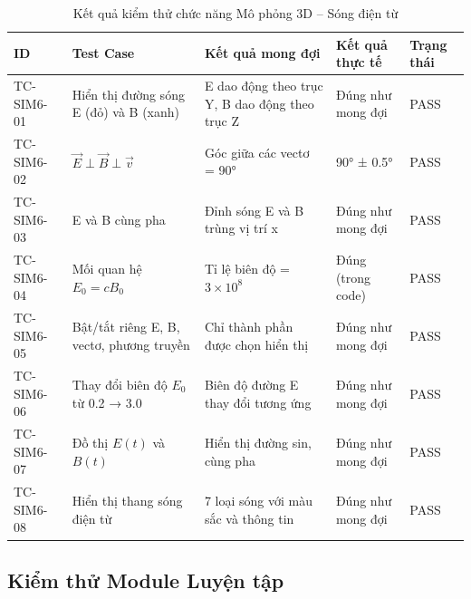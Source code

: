 \begin{table}[H]
\centering
\caption{Kết quả kiểm thử chức năng Mô phỏng 3D – Sóng điện từ}
\begin{tabular}{|p{}|p{}|p{}|p{}|p{}|}
\hline
\textbf{ID} & \textbf{Test Case} & \textbf{Kết quả mong đợi} & \textbf{Kết quả thực tế} & \textbf{Trạng thái} \\
\hline
TC-SIM6-01 & Hiển thị đường sóng E (đỏ) và B (xanh) & E dao động theo trục Y, B dao động theo trục Z & Đúng như mong đợi & PASS \\
\hline
TC-SIM6-02 & $\vec{E} \perp \vec{B} \perp \vec{v}$ & Góc giữa các vectơ = 90° & 90° ± 0.5° & PASS \\
\hline
TC-SIM6-03 & E và B cùng pha & Đỉnh sóng E và B trùng vị trí x & Đúng như mong đợi & PASS \\
\hline
TC-SIM6-04 & Mối quan hệ $E_0 = cB_0$ & Tỉ lệ biên độ = $3 \times 10^8$ & Đúng (trong code) & PASS \\
\hline
TC-SIM6-05 & Bật/tắt riêng E, B, vectơ, phương truyền & Chỉ thành phần được chọn hiển thị & Đúng như mong đợi & PASS \\
\hline
TC-SIM6-06 & Thay đổi biên độ $E_0$ từ 0.2 → 3.0 & Biên độ đường E thay đổi tương ứng & Đúng như mong đợi & PASS \\
\hline
TC-SIM6-07 & Đồ thị $E(t)$ và $B(t)$ & Hiển thị đường sin, cùng pha & Đúng như mong đợi & PASS \\
\hline
TC-SIM6-08 & Hiển thị thang sóng điện từ & 7 loại sóng với màu sắc và thông tin & Đúng như mong đợi & PASS \\
\hline
\end{tabular}
\end{table}

\subsection{Kiểm thử Module Luyện tập}

